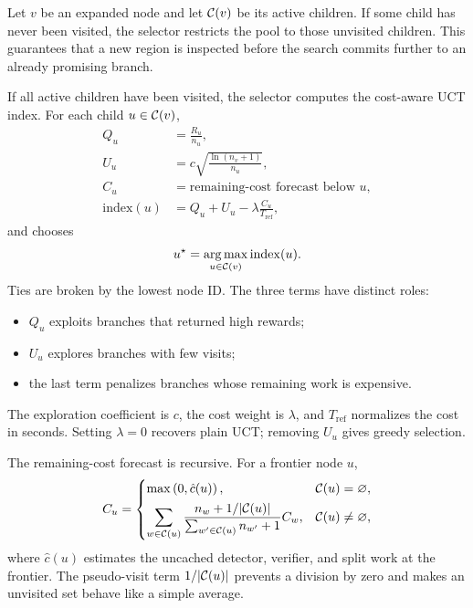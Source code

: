 Let \(v\) be an expanded node and let \(\mathcal{C}(v)\) be its active children. If
some child has never been visited, the selector restricts the pool to those
unvisited children. This guarantees that a new region is inspected before the
search commits further to an already promising branch.

If all active children have been visited, the selector computes the cost-aware
UCT index. For each child \(u\in\mathcal{C}(v)\),
\begin{align}
  Q_u &= \frac{R_u}{n_u}, \\
  U_u &= c \sqrt{\frac{\ln(n_v+1)}{n_u}}, \\
  C_u &= \text{remaining-cost forecast below } u, \\
  \mathrm{index}(u)
  &= Q_u + U_u - \lambda \frac{C_u}{T_{\mathrm{ref}}},
\end{align}
and chooses
\begin{equation}
  u^{\star}
  = \operatorname*{arg\,max}_{u \in \mathcal{C}(v)} \mathrm{index}(u).
  \label{eq:selection}
\end{equation}
Ties are broken by the lowest node ID. The three terms have distinct roles:
\begin{itemize}
  \item \(Q_u\) exploits branches that returned high rewards;
  \item \(U_u\) explores branches with few visits;
  \item the last term penalizes branches whose remaining work is expensive.
\end{itemize}
The exploration coefficient is \(c\), the cost weight is \(\lambda\), and
\(T_{\mathrm{ref}}\) normalizes the cost in seconds. Setting \(\lambda=0\)
recovers plain UCT; removing \(U_u\) gives greedy selection.

The remaining-cost forecast is recursive. For a frontier node \(u\),
\begin{equation}
  C_u =
  \begin{cases}
    \max\left(0, \hat{c}(u)\right), & \mathcal{C}(u)=\varnothing, \\[4pt]
    \displaystyle
    \sum_{w\in\mathcal{C}(u)}
      \frac{n_w + 1/|\mathcal{C}(u)|}
           {\sum_{w'\in\mathcal{C}(u)} n_{w'} + 1}
      C_w, & \mathcal{C}(u)\ne\varnothing,
  \end{cases}
  \label{eq:remaining-cost}
\end{equation}
where \(\hat{c}(u)\) estimates the uncached detector, verifier, and split work
at the frontier. The pseudo-visit term \(1/|\mathcal{C}(u)|\) prevents a division by
zero and makes an unvisited set behave like a simple average.

